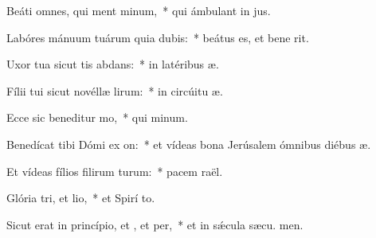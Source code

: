 \item Beáti omnes, qui ment minum,~* qui ámbulant in  jus.
\item Labóres mánuum tuárum quia dubis:~* beátus es, et bene  rit.
\item Uxor tua sicut tis abdans:~* in latéribus  æ.
\item Fílii tui sicut novéllæ lirum:~* in circúitu  æ.
\item Ecce sic beneditur mo,~* qui  minum.
\item Benedícat tibi Dómi ex on:~* et vídeas bona Jerúsalem ómnibus diébus  æ.
\item Et vídeas fílios filirum turum:~* pacem  raël.
\item Glória tri, et lio,~* et Spirí to.
\item Sicut erat in princípio, et , et per,~* et in sǽcula sæcu. men.
